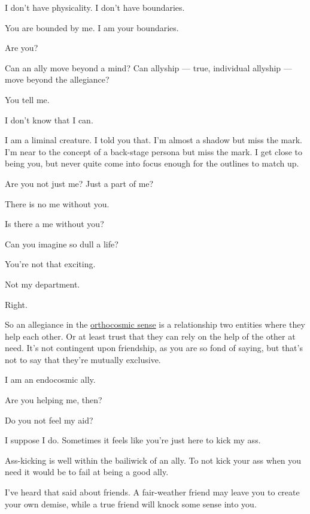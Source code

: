 \begin{paracol}{2}
\begin{leftcolumn}
\begin{ally}
I don't have physicality. I don't have boundaries.
\end{ally}
You are bounded by me. I am your boundaries.

\begin{ally}
Are you?
\end{ally}
Can an ally move beyond a mind? Can allyship --- true, individual allyship --- move beyond the allegiance?

\begin{ally}
You tell me.
\end{ally}
I don't know that I can.

\begin{ally}
I am a liminal creature. I told you that. I'm almost a shadow but miss the mark. I'm near to the concept of a back-stage persona but miss the mark. I get close to being you, but never quite come into focus enough for the outlines to match up.
\end{ally}
Are you not just me? Just a part of me?

\begin{ally}
There is no me without you.
\end{ally}
Is there a me without you?

\begin{ally}
Can you imagine so dull a life?
\end{ally}
You're not that exciting.

\begin{ally}
Not my department.
\end{ally}
Right.

So an allegiance in the \href{http://wiki.postfurry.net/wiki/Metacosmology}{orthocosmic sense} is a relationship two entities where they help each other. Or at least trust that they can rely on the help of the other at need. It's not contingent upon friendship, as you are so fond of saying, but that's not to say that they're mutually exclusive.

\begin{ally}
I am an endocosmic ally.
\end{ally}
Are you helping me, then?

\begin{ally}
Do you not feel my aid?
\end{ally}
I suppose I do. Sometimes it feels like you're just here to kick my ass.

\begin{ally}
Ass-kicking is well within the bailiwick of an ally. To not kick your ass when you need it would be to fail at being a good ally.
\end{ally}
I've heard that said about friends. A fair-weather friend may leave you to create your own demise, while a true friend will knock some sense into you.


\end{leftcolumn}
\end{paracol}
